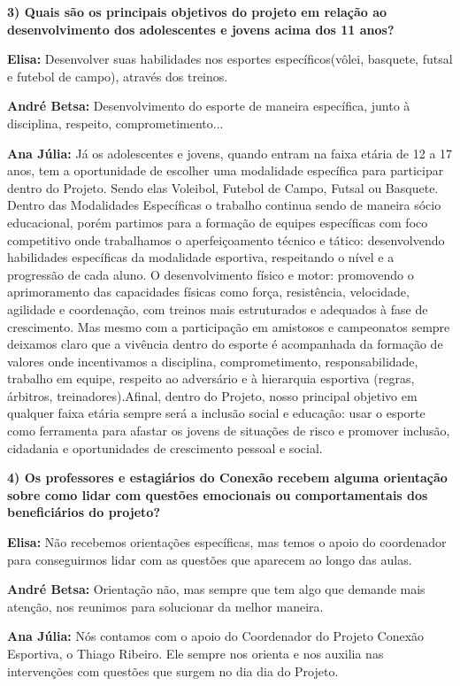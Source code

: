 \textbf{3) Quais são os principais objetivos do projeto em relação ao desenvolvimento dos adolescentes e jovens acima dos 11 anos?}

\textbf{Elisa:} Desenvolver suas habilidades nos esportes específicos(vôlei, basquete, futsal e futebol de campo), através dos treinos.

\textbf{André Betsa:} Desenvolvimento do esporte de maneira específica, junto à disciplina, respeito, comprometimento...

\textbf{Ana Júlia:} Já os adolescentes e jovens, quando entram na faixa etária de 12 a 17 anos, tem a oportunidade de escolher uma modalidade específica para participar dentro do Projeto. Sendo elas Voleibol, Futebol de Campo, Futsal ou Basquete. Dentro das Modalidades Específicas o trabalho continua sendo de maneira sócio educacional, porém partimos para a formação de equipes específicas com foco competitivo onde trabalhamos o aperfeiçoamento técnico e tático: desenvolvendo habilidades específicas da modalidade esportiva, respeitando o nível e a progressão de cada aluno. O desenvolvimento físico e motor: promovendo o aprimoramento das capacidades físicas como força, resistência, velocidade, agilidade e coordenação, com treinos mais estruturados e adequados à fase de crescimento. Mas mesmo com a participação em amistosos e campeonatos sempre deixamos claro que a vivência dentro do esporte é acompanhada da formação de valores onde incentivamos a disciplina, comprometimento, responsabilidade, trabalho em equipe, respeito ao adversário e à hierarquia esportiva (regras, árbitros, treinadores).Afinal, dentro do Projeto, nosso principal objetivo em qualquer faixa etária sempre será a inclusão social e educação: usar o esporte como ferramenta para afastar os jovens de situações de risco e promover inclusão, cidadania e oportunidades de crescimento pessoal e social.

\textbf{4) Os professores e estagiários do Conexão recebem alguma orientação sobre como lidar com questões emocionais ou comportamentais dos beneficiários do projeto?}

\textbf{Elisa:} Não recebemos orientações específicas, mas temos o apoio do coordenador para conseguirmos lidar com as questões que aparecem ao longo das aulas.

\textbf{André Betsa:} Orientação não, mas sempre que tem algo que demande mais atenção, nos reunimos para solucionar da melhor maneira.

\textbf{Ana Júlia:} Nós contamos com o apoio do Coordenador do Projeto Conexão Esportiva, o Thiago Ribeiro. Ele sempre nos orienta e nos auxilia nas intervenções com questões que surgem no dia dia do Projeto.

